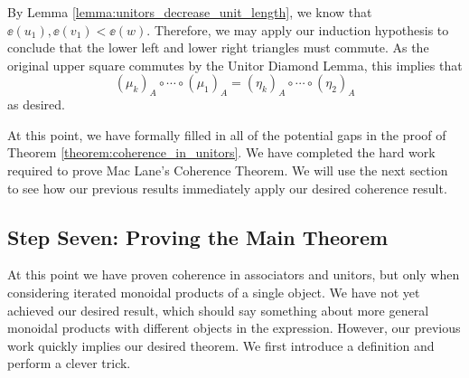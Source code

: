 \begin{prf}
\begin{center}
    \end{center}
    By Lemma \ref{lemma:unitors_decrease_unit_length}, we know that 
    $\ee(u_1), \ee(v_1) < \ee(w)$. Therefore, we may apply our induction 
    hypothesis to conclude that the lower left and lower right triangles must 
    commute. As the original upper square commutes by the Unitor Diamond Lemma, 
    this implies that 
    \[
        (\mu_k)_A \circ \cdots \circ (\mu_1)_A 
        =
        (\eta_k)_A \circ \cdots \circ (\eta_2)_A
    \]
    as desired. 
\end{prf}

At this point, we have formally filled in all of the potential gaps in the proof 
of Theorem \ref{theorem:coherence_in_unitors}. We have completed the
hard work required to prove Mac Lane's Coherence Theorem. We will use the next section 
to see how our previous results immediately apply our desired coherence result.



\newpage
\subsection*{Step Seven: Proving the Main Theorem}

At this point we have proven coherence in associators and unitors, but 
only when considering iterated monoidal products of a single object. 
We have not yet achieved our desired result, which should say something 
about more general monoidal products with different objects in the expression. 
However, our previous work quickly implies our desired theorem. We first introduce 
a definition and perform a clever trick. 

